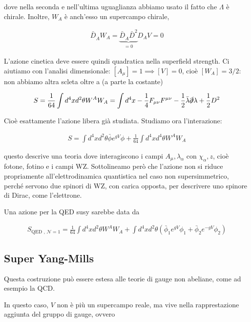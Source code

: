 \documentclass{report}
\begin{document}
dove nella seconda e nell'ultima uguaglianza abbiamo usato il fatto che \(\Lambda\) è chirale. Inoltre, \(W_A\) è anch'esso un supercampo chirale, 

\begin{align}
    \bar{D}_{\dot{A}}W_A = \underbrace{\bar{D}_{\dot{A}}\bar{D}^2}_{=0} D_A V = 0 
\end{align}

L'azione cinetica deve essere quindi quadratica nella superfield strength. Ci aiutiamo con l'analisi dimensionale: \([A_\mu] = 1 \implies [V] = 0\), cioè \([W_A] = 3/2\): non abbiamo altra scleta oltre a (a parte la costante)

\begin{align}
    S = \frac{1}{64}\int d^4x d^2\theta W^A W_A = \int d^4x -\frac{1}{4}F_{\mu\nu}F^{\mu\nu} - \frac{1}{2}\bar{\lambda}\slashed{\partial}\lambda + \frac{1}{2}D^2
\end{align}

Cioè esattamente l'azione libera già studiata. Studiamo ora l'interazione: 

\begin{align}
    S = \int d^4x d^2\theta \bar{\phi}e^{gV}\phi + \frac{1}{64}\int d^4xd^4\theta W^A W_A
\end{align}

questo descrive una teoria dove interagiscono i campi \(A_\mu, \lambda_\alpha\) con \(\chi_\alpha, z\), cioè fotone, fotino e i campi WZ. Sottolineamo però che l'azione non si riduce propriamente all'elettrodinamica quantistica nel caso non supersimmetrico, perché servono due spinori di WZ, con carica opposta, per descrivere uno spinore di Dirac, come l'elettrone. 

Una azione per la QED susy sarebbe data da 

\begin{align}
    S_{\text{QED , } \mathcal{N} =1} = \frac{1}{64}\int d^4x d^2\theta W^A W_A + \int d^4xd^2\theta \left( \bar{\phi}_1e^{gV}\phi_1 + \bar{\phi}_2 e^{-gV}\phi_2 \right)
\end{align}

\subsection{Super Yang-Mills}

Questa costruzione può essere estesa alle teorie di gauge non abeliane, come ad esempio la QCD. 

In questo caso, \(V\) non è più un supercampo reale, ma vive nella rapprestazione aggiunta del gruppo di gauge, ovvero 
\end{document}
